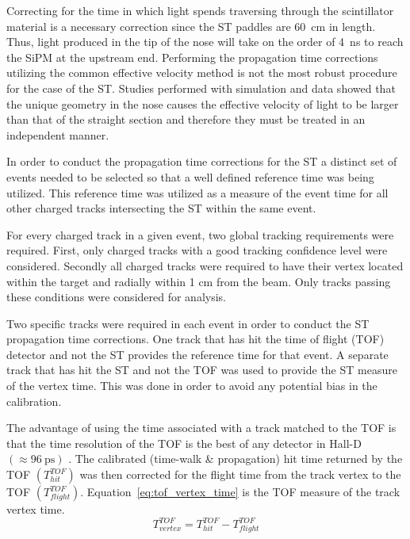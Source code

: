 Correcting for the time in which light spends traversing through the scintillator material is a necessary correction since the ST paddles are 60~cm in length.  Thus, light produced in the tip of the nose will take on the order of 4~ns to reach the SiPM at the upstream end.  Performing the propagation time corrections utilizing the common effective velocity method is not the most robust procedure for the case of the ST.  Studies performed with simulation and data showed that the unique geometry in the nose causes the effective velocity of light to be larger than that of the straight section and therefore they must be treated in an independent manner.

In order to conduct the propagation time corrections for the ST a distinct set of events needed to be selected so that a well defined reference time was being utilized.  This reference time was utilized as a measure of the event time for all other charged tracks intersecting the ST within the same event.  

For every charged track in a given event, two global tracking requirements were required.  First, only charged tracks with a good tracking confidence level were considered.  Secondly all charged tracks were required to have their vertex located within the target and radially within 1 cm from the beam. Only tracks passing these conditions were considered for analysis.

Two specific tracks were required in each event in order to conduct the ST propagation time corrections.  One track that has hit the time of flight (TOF) detector and not the ST provides the reference time for that event.  A separate track that has hit the ST and not the TOF was used to provide the ST measure of the vertex time.  This was done in order to avoid any potential bias in the calibration.  
	

The advantage of using the time associated with a track matched to the TOF is that the time resolution of the TOF is the best of any detector in Hall-D $(\approx 96\ \mathrm{ps})$ \cite{zihlmann_tof}. The calibrated (time-walk \& propagation) hit time returned by the TOF $(T^{TOF}_{hit})$ was then corrected for the flight time from the track vertex to the TOF $(T^{TOF}_{flight})$.  Equation~\ref{eq:tof_vertex_time} is the TOF measure of the track vertex time.
	\begin{equation} \label{eq:tof_vertex_time}
		T^{TOF}_{vertex} = T^{TOF}_{hit} - T^{TOF}_{flight}
	\end{equation}

